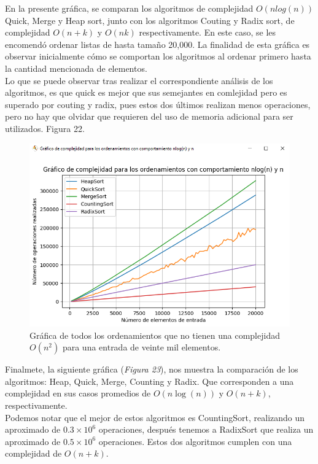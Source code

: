 \documentclass[a4paper,12pt]{article}
\begin{document}
En la presente gráfica, se comparan los algoritmos de complejidad $O(nlog(n))$ Quick, Merge y Heap sort, junto con los algoritmos Couting y Radix sort, de complejidad $O(n+k)$ y $O(nk)$ respectivamente. En este caso, se les encomendó ordenar listas de hasta tamaño 20,000. La finalidad de esta gráfica es observar inicialmente cómo se comportan los algoritmos al ordenar primero hasta la cantidad mencionada de elementos.\\

Lo que se puede observar tras realizar el correspondiente análisis de los algoritmos, es que quick es mejor que sus semejantes en comlejidad pero es superado por couting y radix, pues estos dos últimos realizan menos operaciones, pero no hay que olvidar que requieren del uso de memoria adicional para ser utilizados. Figura 22.

\begin{figure}[h]
    \centering
    \includegraphics[width=1\textwidth]{media/graficaE_20k.png}
    \caption{Gráfica de todos los ordenamientos que no tienen una complejidad $O(n^2)$ para una entrada de veinte mil elementos.}
    \label{fig:grafE_20k}
\end{figure}

Finalmete, la siguiente gráfica (\textit{Figura 23}), nos muestra la comparación de los algoritmos: Heap, Quick, Merge, Counting y Radix. Que corresponden a una complejidad en sus casos promedios de $O(n\log(n))$ y $O(n+k)$, respectivamente. \\

Podemos notar que el mejor de estos algoritmos es CountingSort, realizando un aproximado de $0.3 \times 10^6$ operaciones, después tenemos a RadixSort que realiza un aproximado de $0.5 \times 10^6$ operaciones. Estos dos algoritmos cumplen con una complejidad de $O(n+k)$. \\
\end{document}
